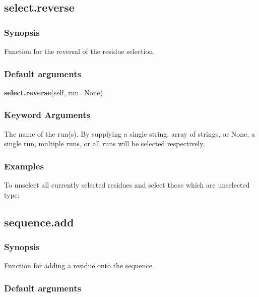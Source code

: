 \newpage

\subsection{select.reverse}


\subsubsection{Synopsis}

Function for the reversal of the residue selection.

\subsubsection{Default arguments}

\textsf{\textbf{select.reverse}(self, run=None)}


\subsubsection{Keyword Arguments}

  The name of the run(s).  By supplying a single string, array of strings, or None, a single run, multiple runs, or all runs will be selected respectively.

\subsubsection{Examples}

To unselect all currently selected residues and select those which are unselected type:




\newpage

\subsection{sequence.add}


\subsubsection{Synopsis}

Function for adding a residue onto the sequence.

\subsubsection{Default arguments}

